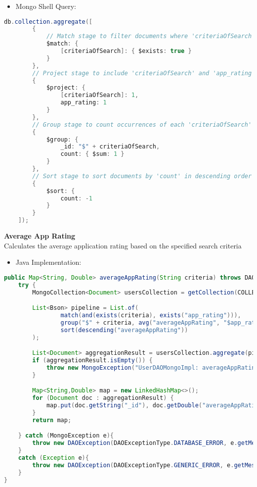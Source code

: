 \begin{itemize}
    \item Mongo Shell Query:
\end{itemize}
\begin{mdframed}[style=customstyle]
\begin{lstlisting}[language=java]
    db.collection.aggregate([
        {
            // Match stage to filter documents where 'criteriaOfSearch' exists
            $match: {
                [criteriaOfSearch]: { $exists: true }
            }
        },
        // Project stage to include 'criteriaOfSearch' and 'app_rating' fields
        {
            $project: {
                [criteriaOfSearch]: 1,
                app_rating: 1
            }
        },
        // Group stage to count occurrences of each 'criteriaOfSearch'
        {
            $group: {
                _id: "$" + criteriaOfSearch,
                count: { $sum: 1 }
            }
        },
        // Sort stage to sort documents by 'count' in descending order
        {
            $sort: {
                count: -1
            }
        }
    ]);\end{lstlisting}
\end{mdframed} 

\textbf{Average App Rating}\\
Calculates the average application rating based on the specified search criteria
\begin{itemize}
    \item Java Implementation:
\end{itemize}

\begin{mdframed}[style=customstyle]
\begin{lstlisting}[language=java]
    public Map<String, Double> averageAppRating(String criteria) throws DAOException {
    try {
        MongoCollection<Document> usersCollection = getCollection(COLLECTION_NAME);

        List<Bson> pipeline = List.of(
                match(and(exists(criteria), exists("app_rating"))),
                group("$" + criteria, avg("averageAppRating", "$app_rating")),
                sort(descending("averageAppRating"))
        );

        List<Document> aggregationResult = usersCollection.aggregate(pipeline).into(new ArrayList<>());
        if (aggregationResult.isEmpty()) {
            throw new MongoException("UserDAOMongoImpl: averageAppRating: No data found");
        }

        Map<String,Double> map = new LinkedHashMap<>();
        for (Document doc : aggregationResult) {
            map.put(doc.getString("_id"), doc.getDouble("averageAppRating"));
        }
        return map;

    } catch (MongoException e){
        throw new DAOException(DAOExceptionType.DATABASE_ERROR, e.getMessage());
    }
    catch (Exception e){
        throw new DAOException(DAOExceptionType.GENERIC_ERROR, e.getMessage());
    }
}\end{lstlisting}
\end{mdframed}
        
